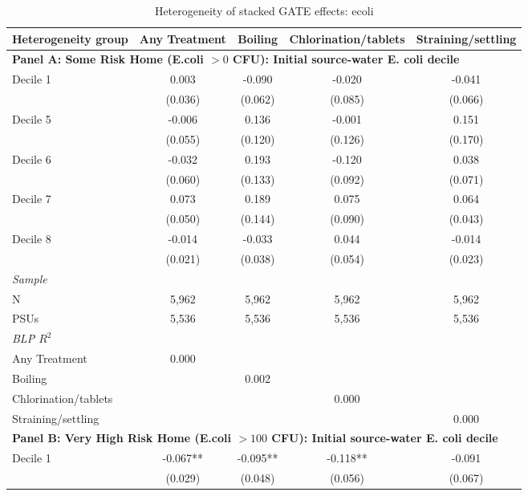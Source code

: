 \begin{landscape}
\begin{table}[p]
\centering
\caption{Heterogeneity of stacked GATE effects: ecoli}
\label{tab:table_heterogeneity_main-ecoli}
\scriptsize\setlength{\tabcolsep}{4pt}
\begin{adjustbox}{max width=\linewidth, center}
\begin{tabular}{lcccc}
\toprule
Heterogeneity group & Any Treatment & Boiling & Chlorination/tablets & Straining/settling \\
\midrule
\multicolumn{5}{l}{\textbf{Panel A: Some Risk Home (E.coli $>0$ CFU): Initial source-water E. coli decile}} \\
Decile 1 & 0.003 & -0.090 & -0.020 & -0.041 \\
 & (0.036) & (0.062) & (0.085) & (0.066) \\
Decile 5 & -0.006 & 0.136 & -0.001 & 0.151 \\
 & (0.055) & (0.120) & (0.126) & (0.170) \\
Decile 6 & -0.032 & 0.193 & -0.120 & 0.038 \\
 & (0.060) & (0.133) & (0.092) & (0.071) \\
Decile 7 & 0.073 & 0.189 & 0.075 & 0.064 \\
 & (0.050) & (0.144) & (0.090) & (0.043) \\
Decile 8 & -0.014 & -0.033 & 0.044 & -0.014 \\
 & (0.021) & (0.038) & (0.054) & (0.023) \\
\multicolumn{5}{l}{\textit{Sample}} \\
\quad N & 5,962 & 5,962 & 5,962 & 5,962 \\
\quad PSUs & 5,536 & 5,536 & 5,536 & 5,536 \\
\multicolumn{5}{l}{\textit{BLP $R^{2}$}} \\
\quad Any Treatment & 0.000 &  &  &  \\
\quad Boiling &  & 0.002 &  &  \\
\quad Chlorination/tablets &  &  & 0.000 &  \\
\quad Straining/settling &  &  &  & 0.000 \\
\midrule
\multicolumn{5}{l}{\textbf{Panel B: Very High Risk Home (E.coli $>100$ CFU): Initial source-water E. coli decile}} \\
Decile 1 & -0.067** & -0.095** & -0.118** & -0.091 \\
 & (0.029) & (0.048) & (0.056) & (0.067) \\

\end{tabular}
\end{adjustbox}
\end{table}
\end{landscape}

